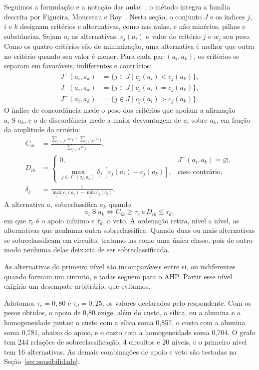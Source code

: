 \documentclass[conference]{IEEEtran}
\begin{document}
Seguimos a formulação e a notação das aulas~\cite{aula_electre}; o método integra a família descrita por Figueira, Mousseau e Roy~\cite{figueira2005}. Nesta seção, o conjunto $J$ e os índices $j$, $i$ e $k$ designam critérios e alternativas, como nas aulas, e não minérios, pilhas e substâncias. Sejam $a_i$ as alternativas, $c_j(a_i)$ o valor do critério $j$ e $w_j$ seu peso. Como os quatro critérios são de minimização, uma alternativa é melhor que outra no critério quando seu valor é menor. Para cada par $(a_i,a_k)$, os critérios se separam em favoráveis, indiferentes e contrários:
\begin{align}
J^{+}(a_i,a_k) &= \{j\in J \mid c_j(a_i) < c_j(a_k)\},\\
J^{=}(a_i,a_k) &= \{j\in J \mid c_j(a_i) = c_j(a_k)\},\\
J^{-}(a_i,a_k) &= \{j\in J \mid c_j(a_i) > c_j(a_k)\}.
\end{align}
O índice de concordância mede o peso dos critérios que apoiam a afirmação $a_i \mathrel{S} a_k$, e o de discordância mede a maior desvantagem de $a_i$ sobre $a_k$, em fração da amplitude do critério:
\begin{align}
C_{ik} &= \frac{\sum_{j\in J^{+}} w_j + \sum_{j\in J^{=}} w_j}{\sum_{j\in J} w_j},\\
D_{ik} &=
\begin{cases}
0, & J^{-}(a_i,a_k)=\varnothing,\\
\displaystyle\max_{j\in J^{-}(a_i,a_k)} \delta_j\,[c_j(a_i)-c_j(a_k)], & \text{caso contrário,}
\end{cases}\\
\delta_j &= \frac{1}{\max_i c_j(a_i)-\min_i c_j(a_i)}.
\end{align}
A alternativa $a_i$ sobreclassifica $a_k$ quando
\begin{equation}
a_i \mathrel{S} a_k \iff C_{ik}\geq\tau_c \ \text{e}\ D_{ik}\leq\tau_d,
\end{equation}
em que $\tau_c$ é o apoio mínimo e $\tau_d$, o veto. A ordenação retira, nível a nível, as alternativas que nenhuma outra sobreclassifica. Quando duas ou mais alternativas se sobreclassificam em circuito, tratamo-las como uma única classe, pois de outro modo nenhuma delas deixaria de ser sobreclassificada.

As alternativas do primeiro nível são incomparáveis entre si, ou indiferentes quando formam um circuito, e todas seguem para o AHP. Partir esse nível exigiria um desempate arbitrário, que evitamos.

Adotamos $\tau_c=0{,}80$ e $\tau_d=0{,}25$, os valores declarados pelo respondente. Com os pesos obtidos, o apoio de 0{,}80 exige, além do custo, a sílica, ou a alumina e a homogeneidade juntas: o custo com a sílica soma 0{,}857, o custo com a alumina soma 0{,}781, abaixo do apoio, e o custo com a homogeneidade soma 0{,}704. O grafo tem 244 relações de sobreclassificação, 4 circuitos e 20 níveis, e o primeiro nível tem 16 alternativas. As demais combinações de apoio e veto são testadas na Seção~\ref{sec:sensibilidade}.
\end{document}

